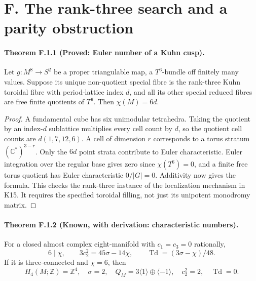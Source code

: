


\section{F. The rank-three search and a parity obstruction}

\paragraph{Theorem F.1.1 (Proved: Euler number of a Kuhn cusp).}
Let $g:M^8\to S^2$ be a proper triangulable map, a $T^6$-bundle
off finitely many values.  Suppose its unique non-quotient special
fibre is the rank-three Kuhn toroidal fibre with period-lattice
index $d$, and all its other special reduced fibres are free
finite quotients of $T^6$.  Then $\chi(M)=6d$.

\begin{proof}
A fundamental cube has six unimodular tetrahedra.  Taking the
quotient by an index-$d$ sublattice multiplies every cell count
by $d$, so the quotient cell counts are $d(1,7,12,6)$.
A cell of dimension $r$ corresponds to a torus stratum
$(\mathbb C^*)^{3-r}$.  Only the $6d$ point strata contribute
to Euler characteristic.  Euler integration over the regular
base gives zero since $\chi(T^6)=0$, and a finite free torus
quotient has Euler characteristic $0/|G|=0$.  Additivity now
gives the formula.  This checks the rank-three instance of the
localization mechanism in K15.  It requires the specified
toroidal filling, not just its unipotent monodromy matrix.
\end{proof}

\paragraph{Theorem F.1.2 (Known, with derivation: characteristic numbers).}
For a closed almost complex eight-manifold with $c_1=c_3=0$
rationally,
\[
 6\mid\chi,\qquad
 3c_2^2=45\sigma-14\chi,\qquad
 \operatorname{Td}=(3\sigma-\chi)/48.
 \tag{F.1}
\]
If it is three-connected and $\chi=6$, then
\[
 H_4(M;\mathbb Z)=\mathbb Z^4,\quad
 \sigma=2,\quad Q_M=3\langle1\rangle\oplus\langle-1\rangle,
 \quad c_2^2=2,\quad\operatorname{Td}=0.
 \tag{F.2}
\]


